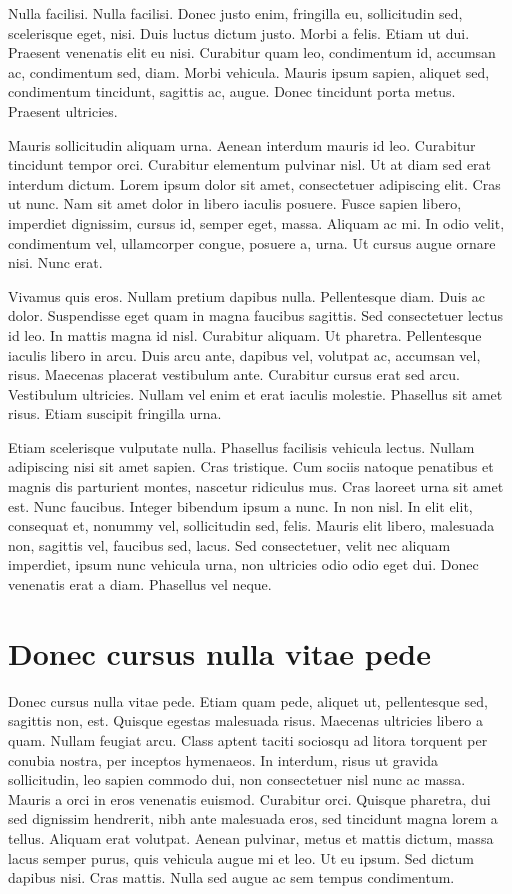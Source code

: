 \documentclass[printmode]{mgr}
\begin{document}
Nulla facilisi. Nulla facilisi. Donec justo enim, fringilla eu,
sollicitudin sed, scelerisque eget, nisi. Duis luctus dictum
justo. Morbi a felis. Etiam ut dui. Praesent venenatis elit eu
nisi. Curabitur quam leo, condimentum id, accumsan ac, condimentum
sed, diam. Morbi vehicula. Mauris ipsum sapien, aliquet sed,
condimentum tincidunt, sagittis ac, augue. Donec tincidunt porta
metus. Praesent ultricies.

Mauris sollicitudin aliquam urna. Aenean interdum mauris id
leo. Curabitur tincidunt tempor orci. Curabitur elementum pulvinar
nisl. Ut at diam sed erat interdum dictum. Lorem ipsum dolor sit amet,
consectetuer adipiscing elit. Cras ut nunc. Nam sit amet dolor in
libero iaculis posuere. Fusce sapien libero, imperdiet dignissim,
cursus id, semper eget, massa. Aliquam ac mi. In odio velit,
condimentum vel, ullamcorper congue, posuere a, urna. Ut cursus augue
ornare nisi. Nunc erat.

Vivamus quis eros. Nullam pretium dapibus nulla. Pellentesque
diam. Duis ac dolor. Suspendisse eget quam in magna faucibus
sagittis. Sed consectetuer lectus id leo. In mattis magna id
nisl. Curabitur aliquam. Ut pharetra. Pellentesque iaculis libero in
arcu. Duis arcu ante, dapibus vel, volutpat ac, accumsan vel,
risus. Maecenas placerat vestibulum ante. Curabitur cursus erat sed
arcu. Vestibulum ultricies. Nullam vel enim et erat iaculis
molestie. Phasellus sit amet risus. Etiam suscipit fringilla urna.

Etiam scelerisque vulputate nulla. Phasellus facilisis vehicula
lectus. Nullam adipiscing nisi sit amet sapien. Cras tristique. Cum
sociis natoque penatibus et magnis dis parturient montes, nascetur
ridiculus mus. Cras laoreet urna sit amet est. Nunc faucibus. Integer
bibendum ipsum a nunc. In non nisl. In elit elit, consequat et,
nonummy vel, sollicitudin sed, felis. Mauris elit libero, malesuada
non, sagittis vel, faucibus sed, lacus. Sed consectetuer, velit nec
aliquam imperdiet, ipsum nunc vehicula urna, non ultricies odio odio
eget dui. Donec venenatis erat a diam. Phasellus vel neque.

\appendix
\chapter{Donec cursus nulla vitae pede}
Donec cursus nulla vitae pede. Etiam quam pede, aliquet ut,
pellentesque sed, sagittis non, est. Quisque egestas malesuada
risus. Maecenas ultricies libero a quam. Nullam feugiat arcu. Class
aptent taciti sociosqu ad litora torquent per conubia nostra, per
inceptos hymenaeos. In interdum, risus ut gravida sollicitudin, leo
sapien commodo dui, non consectetuer nisl nunc ac massa. Mauris a orci
in eros venenatis euismod. Curabitur orci. Quisque pharetra, dui sed
dignissim hendrerit, nibh ante malesuada eros, sed tincidunt magna
lorem a tellus. Aliquam erat volutpat. Aenean pulvinar, metus et
mattis dictum, massa lacus semper purus, quis vehicula augue mi et
leo. Ut eu ipsum. Sed dictum dapibus nisi. Cras mattis. Nulla sed
augue ac sem tempus condimentum.
\end{document}
